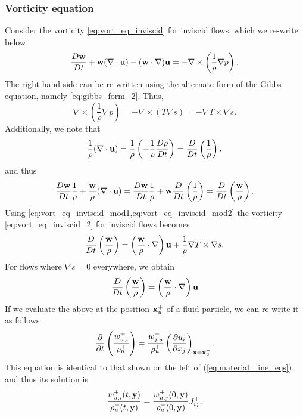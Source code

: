 \documentclass[oneside,a4paper,11pt]{report}
\begin{document}
\subsubsection{Vorticity equation}
Consider the vorticity \cref{eq:vort_eq_inviscid} for inviscid flows, which we re-write below
\begin{equation}
\label{eq:vort_eq_inviscid_2}
\frac{D \mathbf{w}}{D t} +  \mathbf{w}(\nabla \cdot \mathbf{u}) - (\mathbf{w} \cdot \nabla) \mathbf{u} = -\nabla \times \left ( \frac{1}{\rho} \nabla p \right).
\end{equation}
The right-hand side can be re-written using the alternate form of the Gibbs equation, namely \cref{eq:gibbs_form_2}. Thus,
\begin{equation}
\label{eq:vort_eq_inviscid_mod1}
    \nabla \times \left (\frac{1}{\rho} \nabla p \right) = -\nabla \times (T \nabla s) = -\nabla T \times \nabla s .
\end{equation}
Additionally, we note that
\begin{equation}
    \frac{1}{\rho} ( \nabla \cdot \mathbf{u}) = \frac{1}{\rho} \left ( -\frac{1}{\rho} \frac{D\rho}{Dt} \right ) = \frac{D}{Dt} \left (\frac{1}{\rho} \right ).
\end{equation}
and thus
\begin{equation}
\label{eq:vort_eq_inviscid_mod2}
    \frac{D\mathbf{w}}{Dt} \frac{1}{\rho} + \frac{\mathbf{w}}{\rho} (\nabla \cdot \mathbf{u}) = \frac{D\mathbf{w}}{Dt} \frac{1}{\rho} + \mathbf{w} \frac{D}{Dt} \left (\frac{1}{\rho} \right ) = \frac{D}{Dt} \left (\frac{\mathbf{w}}{\rho} \right).
\end{equation}
Using \cref{eq:vort_eq_inviscid_mod1,eq:vort_eq_inviscid_mod2} the vorticity \cref{eq:vort_eq_inviscid_2} for inviscid flows becomes
\begin{equation}
\frac{D}{Dt} \left (\frac{\mathbf{w}}{\rho} \right ) = \left( \frac{\mathbf{w}}{\rho} \cdot \nabla \right) \mathbf{u} + \frac{1}{\rho} \nabla T \times \nabla s.
\end{equation}
For flows where $\nabla s = 0$ everywhere, we obtain
\begin{equation}
\frac{D}{Dt} \left (\frac{\mathbf{w}}{\rho} \right ) = \left( \frac{\mathbf{w}}{\rho} \cdot \nabla \right) \mathbf{u}
\end{equation}
If we evaluate the above at the position $\mathbf{x}^+_u$ of a fluid particle, we can re-write it as follows
\begin{equation}
\frac{\partial}{\partial t} \left ( \frac{w^+_{u,i}}{\rho^+_u} \right ) = \frac{w^+_{j,u}}{\rho^+_u} \left ( \frac{\partial u_i}{\partial x_j} \right )_{\mathbf{x} = \mathbf{x}^+_u}.
\end{equation}
This equation is identical to that shown on the left of (\ref{eq:material_line_eqs}), and thus its solution is 
\begin{equation}
\frac{w^+_{u,i}(t,\mathbf{y})}{\rho^+_u(t,\mathbf{y})} = \frac{w^+_{u,j}(0,\mathbf{y})}{\rho^+_u(0,\mathbf{y})} J^+_{ij}.
\end{equation}
\end{document}

